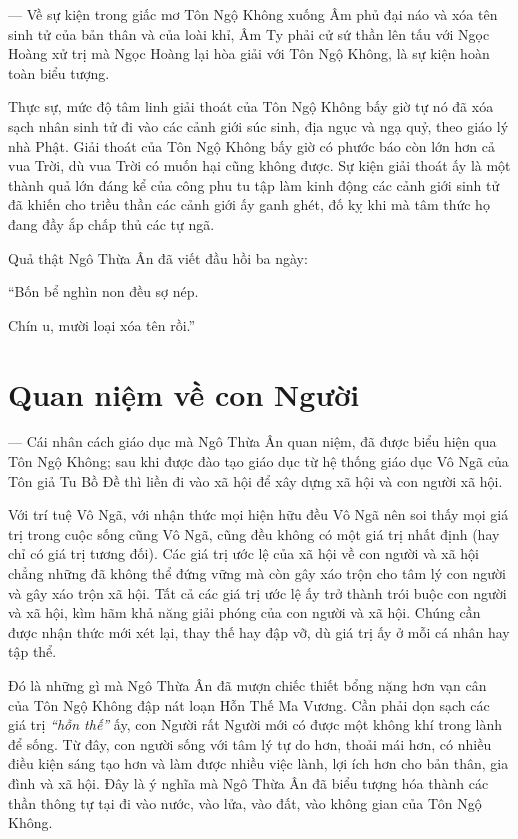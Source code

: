 — Về sự kiện trong giấc mơ Tôn Ngộ Không xuống Âm phủ đại náo và xóa tên sinh tử của bản thân và của loài khỉ, Âm Ty phải cử sứ thần lên tấu với Ngọc Hoàng xử trị mà Ngọc Hoàng lại hòa giải với Tôn Ngộ Không, là sự kiện hoàn toàn biểu tượng.

Thực sự, mức độ tâm linh giải thoát của Tôn Ngộ Không bấy giờ tự nó đã xóa sạch nhân sinh tử đi vào các cảnh giới súc sinh, địa ngục và ngạ quỷ, theo giáo lý nhà Phật. Giải thoát của Tôn Ngộ Không bấy giờ có phước báo còn lớn hơn cả vua Trời, dù vua Trời có muốn hại cũng không được. Sự kiện giải thoát ấy là một thành quả lớn đáng kể của công phu tu tập làm kinh động các cảnh giới sinh tử đã khiến cho triều thần các cảnh giới ấy ganh ghét, đố kỵ khi mà tâm thức họ đang đầy ắp chấp thủ các tự ngã.

Quả thật Ngô Thừa Ân đã viết đầu hồi ba ngày:

\begin{itshape}
``Bốn bể nghìn non đều sợ nép.

Chín u, mười loại xóa tên rồi.''
\end{itshape}


\section{Quan niệm về con Người} %
\label{sec:3_quan_niem_con_nguoi}

— Cái nhân cách giáo dục mà Ngô Thừa Ân quan niệm, đã được biểu hiện qua Tôn Ngộ Không; sau khi được đào tạo giáo dục từ hệ thống giáo dục Vô Ngã của Tôn giả Tu Bồ Đề thì liền đi vào xã hội để xây dựng xã hội và con người xã hội.

Với trí tuệ Vô Ngã, với nhận thức mọi hiện hữu đều Vô Ngã nên soi thấy mọi giá trị trong cuộc sống cũng Vô Ngã, cũng đều không có một giá trị nhất định (hay chỉ có giá trị tương đối). Các giá trị ước lệ của xã hội về con người và xã hội chẳng những đã không thể đứng vững mà còn gây xáo trộn cho tâm lý con người và gây xáo trộn xã hội. Tất cả các giá trị ước lệ ấy trở thành trói buộc con người và xã hội, kìm hãm khả năng giải phóng của con người và xã hội. Chúng cần được nhận thức mới xét lại, thay thế hay đập vỡ, dù giá trị ấy ở mỗi cá nhân hay tập thể.

Đó là những gì mà Ngô Thừa Ân đã mượn chiếc thiết bổng nặng hơn vạn cân của Tôn Ngộ Không đập nát loạn Hỗn Thế Ma Vương. Cần phải dọn sạch các giá trị \emph{``hỗn thế''} ấy, con Người rất Người mới có được một không khí trong lành để sống. Từ đây, con người sống với tâm lý tự do hơn, thoải mái hơn, có nhiều điều kiện sáng tạo hơn và làm được nhiều việc lành, lợi ích hơn cho bản thân, gia đình và xã hội. Đây là ý nghĩa mà Ngô Thừa Ân đã biểu tượng hóa thành các thần thông tự tại đi vào nước, vào lửa, vào đất, vào không gian của Tôn Ngộ Không.

